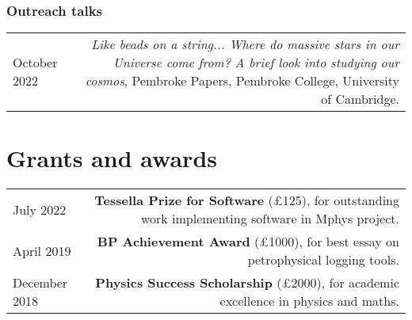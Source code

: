 \documentclass{article}
\begin{document}
\subsubsection*{Outreach talks}
\begin{tabular}{L!{\vrule}R}

  October 2022 & \textit{Like beads on a string... Where do massive stars in our Universe come from? A brief look into studying our cosmos}, Pembroke Papers, Pembroke College, University of Cambridge. \\

\end{tabular}

\section*{Grants and awards}

\begin{tabular}{L!{\vrule}R}

    July 2022 & \textbf{Tessella Prize for Software} (£125), for outstanding work implementing software in Mphys project. \\
    April 2019 & \textbf{BP Achievement Award} (£1000), for best essay on petrophysical logging tools. \\
    December 2018 & \textbf{Physics Success Scholarship} (£2000), for academic excellence in physics and maths.\\

\end{tabular}

\begin{comment}
\section*{Posters Presentations}

\begin{tabular}{L!{\vrule}R}
	March 2021 & \href{https://github.com/htjb/Talks/blob/master/Posters/SKA_globalemu_March_2021/globalemu.pdf}{\textit{globalemu: A novel and robust approach for emulating the sky averaged 21-cm signal from the cosmic dawn and epoch of reionization}}, A Precursor View of the SKA Sky, Virtual Conference\\
	December 2019 & \href{https://drive.google.com/file/d/1dvgumyu4cXxXqoYxikU3DKOa4u_gpGzn/view}{\textit{REACH: Radio Experiment for the Analysis of Cosmic Hydrogen}}, Science At Low Frequencies VI, Arizona State University \\
	November 2019 & \href{https://github.com/htjb/Talks/blob/master/Posters/Cav_Graduate_Conf_REACH_Nov_2019/REACH_poster.pdf}{\textit{REACH: Radio Experiment for the Analysis of Cosmic Hydrogen}}, Cavendish Graduate Conference, University of Cambridge
\end{tabular}
\end{comment}
\end{document}
